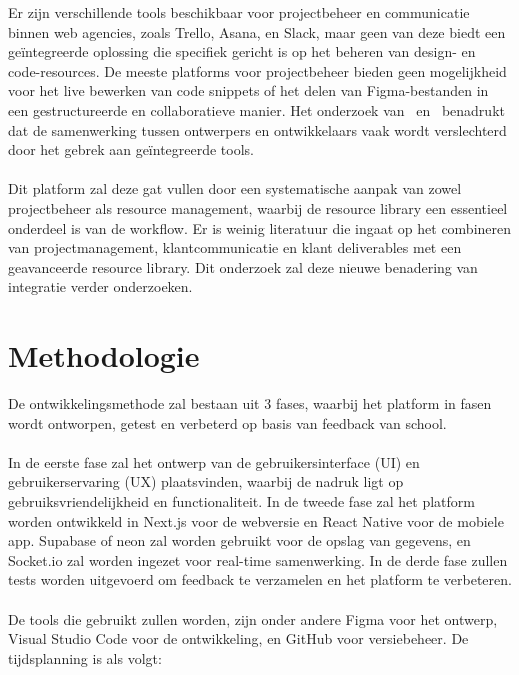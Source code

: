 Er zijn verschillende tools beschikbaar voor projectbeheer en communicatie binnen web agencies, zoals Trello, Asana, en Slack, maar geen van deze biedt een geïntegreerde oplossing die specifiek gericht is op het beheren van design- en code-resources. De meeste platforms voor projectbeheer bieden geen mogelijkheid voor het live bewerken van code snippets of het delen van Figma-bestanden in een gestructureerde en collaboratieve manier. Het onderzoek van~\textcite{Reid2014} en~\textcite{Alexander2019} benadrukt dat de samenwerking tussen ontwerpers en ontwikkelaars vaak wordt verslechterd door het gebrek aan geïntegreerde tools.
\\
\\
Dit platform zal deze gat vullen door een systematische aanpak van zowel projectbeheer als resource management, waarbij de resource library een essentieel onderdeel is van de workflow. Er is weinig literatuur die ingaat op het combineren van projectmanagement, klantcommunicatie en klant deliverables met een geavanceerde resource library. Dit onderzoek zal deze nieuwe benadering van integratie verder onderzoeken.





\section{Methodologie}%
\label{sec:methodologie}

De ontwikkelingsmethode zal bestaan uit 3 fases, waarbij het platform in fasen wordt ontworpen, getest en verbeterd op basis van feedback van school.
\\
\\
In de eerste fase zal het ontwerp van de gebruikersinterface (UI) en gebruikerservaring (UX) plaatsvinden, waarbij de nadruk ligt op gebruiksvriendelijkheid en functionaliteit. In de tweede fase zal het platform worden ontwikkeld in Next.js voor de webversie en React Native voor de mobiele app. Supabase of neon zal worden gebruikt voor de opslag van gegevens, en Socket.io zal worden ingezet voor real-time samenwerking. In de derde fase zullen tests worden uitgevoerd om feedback te verzamelen en het platform te verbeteren.
\\
\\
De tools die gebruikt zullen worden, zijn onder andere Figma voor het ontwerp, Visual Studio Code voor de ontwikkeling, en GitHub voor versiebeheer. De tijdsplanning is als volgt:

